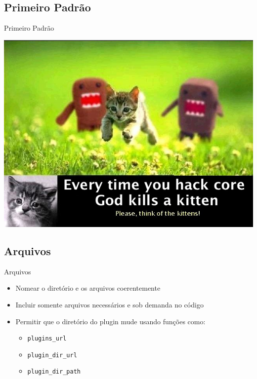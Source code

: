 \documentclass{beamer}
\begin{document}
\begin{frame}\end{frame}

\subsection{Primeiro Padrão}

\begin{frame}{Primeiro Padrão}
\begin{center}
  \includegraphics[height=0.8\textheight]{./img/hack-core.jpg}
\end{center}
\end{frame}

\subsection{Arquivos}

\begin{frame}{Arquivos}
\begin{itemize}
  \pause \item Nomear o diretório e os arquivos coerentemente
  \pause \item Incluir somente arquivos necessários e sob demanda no código
  \pause \item Permitir que o diretório do plugin mude usando funções como:
  \begin{itemize}
    \pause \item \texttt{plugins\_url}
    \pause \item \texttt{plugin\_dir\_url}
    \pause \item \texttt{plugin\_dir\_path}
  \end{itemize}
\end{itemize}
\end{frame}
\end{document}
